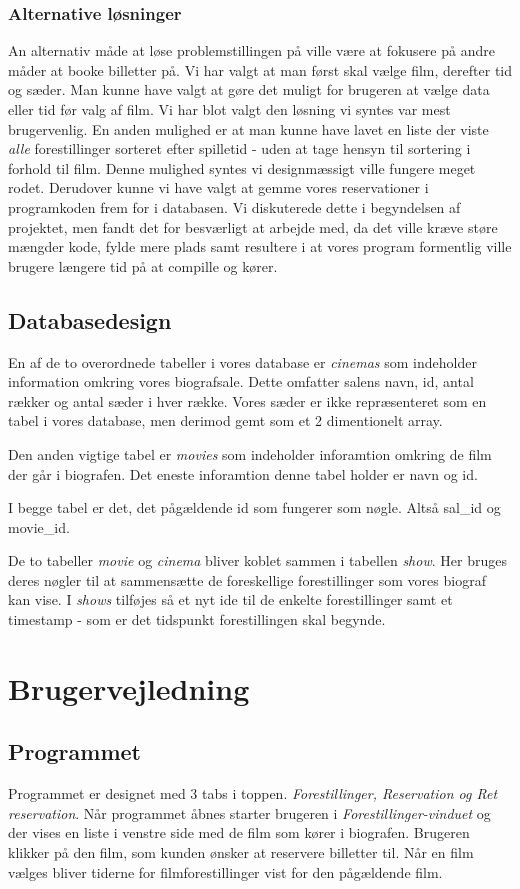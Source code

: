 \documentclass[final]{rapport1}
\begin{document}
\subsection{Alternative løsninger}
An alternativ måde at løse problemstillingen på ville være at fokusere på andre måder at booke billetter på. Vi har valgt at man først skal vælge film, derefter tid og sæder. Man kunne have valgt at gøre det muligt for brugeren at vælge data eller tid før valg af film. Vi har blot valgt den løsning vi syntes var mest brugervenlig. En anden mulighed er at man kunne have lavet en liste der viste \emph{alle} forestillinger sorteret efter spilletid - uden at tage hensyn til sortering i forhold til film. Denne mulighed syntes vi designmæssigt ville fungere meget rodet. Derudover kunne vi have valgt at gemme vores reservationer i programkoden frem for i databasen. Vi diskuterede dette i begyndelsen af projektet, men fandt det for besværligt at arbejde med, da det ville kræve støre mængder kode, fylde mere plads samt resultere i at vores program formentlig ville brugere længere tid på at compille og kører. 

\section{Databasedesign}
En af de to overordnede tabeller i vores database er \emph{cinemas} som indeholder information omkring vores biografsale. Dette omfatter salens navn, id, antal rækker og antal sæder i hver række. Vores sæder er ikke repræsenteret som en tabel i vores database, men derimod gemt som et 2 dimentionelt array. 

Den anden vigtige tabel er \emph{movies} som indeholder inforamtion omkring de film der går i biografen. Det eneste inforamtion denne tabel holder er navn og id.

I begge tabel er det, det pågældende id som fungerer som nøgle. Altså sal\_id og movie\_id.  

De to tabeller \emph{movie} og \emph{cinema} bliver koblet sammen i tabellen \emph{show}. Her bruges deres nøgler til at sammensætte de foreskellige forestillinger som vores biograf kan vise. I \emph{shows} tilføjes så et nyt ide til de enkelte forestillinger samt et timestamp - som er det tidspunkt forestillingen skal begynde.


\chapter{Brugervejledning}
\section{Programmet}
Programmet er designet med 3 tabs i toppen. \emph{Forestillinger, Reservation og Ret reservation}. Når programmet åbnes starter brugeren i \emph{Forestillinger-vinduet} og der vises en liste i venstre side med de film som kører i biografen. Brugeren klikker på den film, som kunden ønsker at reservere billetter til. Når en film vælges bliver tiderne for filmforestillinger vist for den pågældende film. \\
\end{document}
